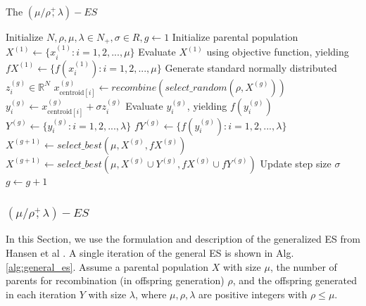 \begin{algorithm}
\caption{The $(\mu/\rho\overset{+}{,}\lambda)-ES$}
\label{alg:general_es}
\begin{algorithmic}[1]
\STATE Initialize $N,\rho,\mu,\lambda \in N_+,\sigma \in R, g \leftarrow 1$
\STATE Initialize parental population $X^{(1)} \leftarrow \{x_i^{(1)}: i=1,2,...,\mu\}$
\STATE Evaluate $X^{(1)}$ using objective function, yielding $fX^{(1)} \leftarrow \{ f(x_i^{(1)}): i=1,2,...,\mu \}$
		\STATE Generate standard normally distributed $z_i^{(g)} \in \mathbb{R}^N $
		\STATE $x_{\text{centroid}[i]}^{(g)} \leftarrow  recombine (select\_random (\rho,X^{(g)}))$ 
		\STATE $y_i^{(g)} \leftarrow x_{\text{centroid}[i]}^{(g)} + \sigma z_i^{(g)}$
		\STATE Evaluate $y_i^{(g)}$, yielding $f(y_i^{(g)})$
	\ENDFOR
	\STATE $Y^{(g)} \leftarrow \{y_i^{(g)}: i=1,2,...,\lambda\}$
	\STATE $fY^{(g)} \leftarrow \{f(y_i^{(g)}): i=1,2,...,\lambda\}$
		\STATE $X^{(g+1)} \leftarrow  select\_best (\mu,X^{(g)},fX^{(g)})$
		\STATE $X^{(g+1)} \leftarrow  select\_best (\mu,X^{(g)} \cup Y^{(g)},fX^{(g)} \cup fY^{(g)})$
	\ENDIF
	\STATE Update step size $\sigma$
	\STATE $g\leftarrow g+1$
\ENDWHILE

\end{algorithmic}
\end{algorithm}

\subsubsection{$(\mu/\rho\overset{+}{,}\lambda)-ES$ }\label{sssec:def_ES}\hfill

In this Section, we use the formulation and description of the generalized ES from Hansen et al \cite{hansen2015evolution}. A single iteration of the general ES is shown in Alg. \ref{alg:general_es}. Assume a parental population $X$ with size $\mu$, the number of parents for recombination (in offspring generation) $\rho$, and the offspring generated in each iteration $Y$ with size $\lambda$, where $\mu,\rho,\lambda$ are positive integers with $\rho \leq \mu$. 


